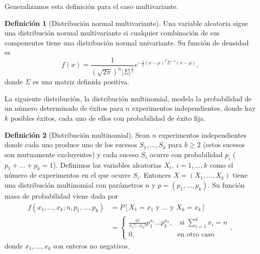 \documentclass[12pt,a4paper]{report} %
\theoremstyle{definition}
\newtheorem{definition}{Definición}[section]
\begin{document}
Generalizamos esta definición para el caso multivariante.\\

\begin{definition}[Distribución normal multivariante]
  Una variable aleatoria sigue una distribución normal multivariante si cualquier combinación de sus componentes tiene una distribución normal univariante. Su función de densidad es \[
f(x) = \frac{1}{\left (\sqrt{2\pi}\right )^n |\Sigma|^{\frac{1}{2}}} e^{-\frac{1}{2}(x-\mu)^T\Sigma^{-1}(x-\mu)},
  \] donde $\Sigma$ es una matriz definida positiva.\\
\end{definition}

La siguiente distribución, la distribución multinomial, modela la probabilidad de un número determinado de éxitos para $n$ experimentos independientes, donde hay $k$ posibles éxitos, cada uno de ellos con probabilidad de éxito fija.\\

\begin{definition}[Distribución multinomial]
 Sean $n$ experimentos independientes donde cada uno produce uno de los sucesos $S_1,\dots,S_k$ para $k\geq 2$ (estos sucesos son mutuamente excluyentes) y cada suceso $S_i$ ocurre con probabilidad $p_i$ ($p_1+\dots+p_k = 1$). Definimos las variables aleatorias $X_i,\ i=1,\dots,k$ como el número de experimentos en el que ocurre $S_i$. Entonces $X=(X_1,\dots,X_k)$ tiene una distribución multinomial con parámetros $n$ y $p = (p_1,\dots, p_k)$. Su función masa de probabilidad viene dada por
\begin{align*}
f(x_1,\dots,x_k; n, p_1,\dots,p_k) &= P[X_1 = x_1\text{ y } \dots \text{ y } X_k = x_k]\\[3pt] &=
\begin{cases}
    \frac{n!}{x_1!\dots x_k!} p_1^{x_1} \dots  p_k^{x_k},\quad\text{si } \sum_{i=1}^kx_i = n\\
    0, \qquad \qquad \qquad\text{en otro caso}
\end{cases},
\end{align*}
donde $x_1,\dots, x_k$ son enteros no negativos.\\
\end{definition}

\end{document}
